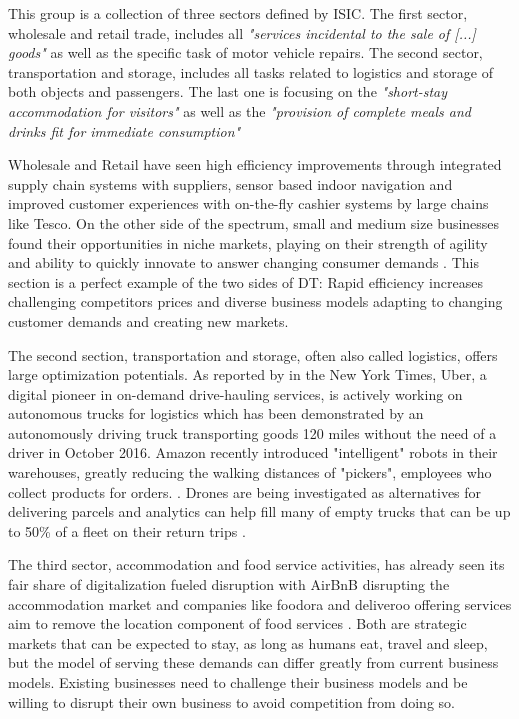 This group is a collection of three sectors defined by \ac{ISIC}. The first sector, wholesale and retail trade, includes all \emph{"services incidental to the sale of [...] goods"}\cite[p.179]{ISIC:2008} as well as the specific task of motor vehicle repairs. The second sector, transportation and storage, includes all tasks related to logistics and storage of both objects and passengers.\cite[p.194]{ISIC:2008} The last one is focusing on the \emph{"short-stay accommodation for visitors"} as well as the \emph{"provision of complete meals and drinks fit for immediate consumption"}\cite[p.202]{ISIC:2008}

Wholesale and Retail have seen high efficiency improvements through integrated supply chain systems with suppliers, sensor based indoor navigation and improved customer experiences with on-the-fly cashier systems \cite{tescoretail:2015, iicretailbrick:2016} by large chains like Tesco. On the other side of the spectrum, small and medium size businesses found their opportunities in niche markets, playing on their strength of agility and ability to quickly innovate to answer changing consumer demands \cite{pwcretailrenaissance:2016}. This section is a perfect example of the two sides of \ac{DT}: Rapid efficiency increases challenging competitors prices and diverse business models adapting to changing customer demands and creating new markets. 

The second section, transportation and storage, often also called logistics, offers large optimization potentials. As reported by \citeauthor{nytimesdrivingtruck:2016} in the New York Times, Uber, a digital pioneer in on-demand drive-hauling services, is actively working on autonomous trucks for logistics which has been demonstrated by an autonomously driving truck transporting goods 120 miles without the need of a driver in October 2016. Amazon recently introduced "intelligent" robots in their warehouses, greatly reducing the walking distances of "pickers", employees who collect products for orders. \cite{Kiva:amazon:Ma:2016:OTA:2936924.2937092}. Drones are being investigated as alternatives for delivering parcels and analytics can help fill many of empty trucks that can be up to 50\% of a fleet on their return trips \cite{worldforumlogistics:2016}.

The third sector, accommodation and food service activities, has already seen its fair share of digitalization fueled disruption with AirBnB disrupting the accommodation market and companies like foodora and deliveroo offering services aim to remove the location component of food services \cite{bloombergfoodora:2016}. Both are strategic markets that can be expected to stay, as long as humans eat, travel and sleep, but the model of serving these demands can differ greatly from current business models. Existing businesses need to challenge their business models and be willing to disrupt their own business to avoid competition from doing so.

